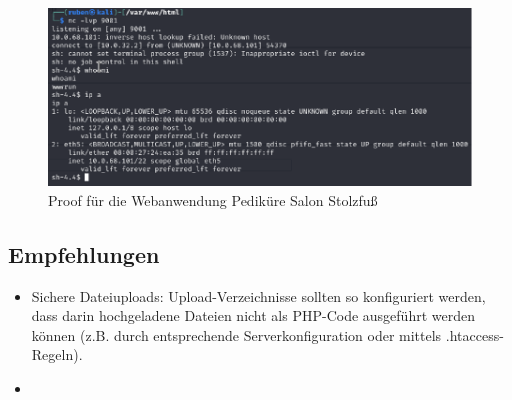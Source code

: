 \begin{figure}[!ht]
    \centering
    \includegraphics[width=\linewidth]{images/proofs/01_pedikuere_salon_proof.png}
    \caption{Proof für die Webanwendung Pediküre Salon Stolzfuß}
    \label{fig:01_pedikuere_salon_proof}
\end{figure}


\subsection*{Empfehlungen}
\begin{itemize}
    \item Sichere Dateiuploads: Upload-Verzeichnisse sollten so konfiguriert werden, dass darin hochgeladene Dateien nicht als PHP-Code ausgeführt werden können (z.B. durch entsprechende Serverkonfiguration oder mittels .htaccess-Regeln).
    \item 
\end{itemize}












